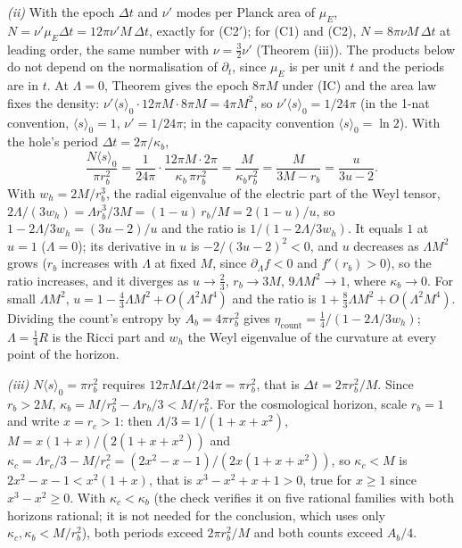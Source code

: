 \emph{(ii)} With the epoch $\Delta t$ and $\nu'$ modes per Planck area of $\mu_{E}$, $N = \nu'\mu_{E}\Delta t = 12\pi\nu' M\,\Delta t$, exactly for (C2$'$); for (C1) and (C2), $N = 8\pi\nu M\,\Delta t$ at leading order, the same number with $\nu = \tfrac32\nu'$ (Theorem (iii)). The products below do not depend on the normalisation of $\partial_{t}$, since $\mu_{E}$ is per unit $t$ and the periods are in $t$. At $\Lambda = 0$, Theorem  gives the epoch $8\pi M$ under (IC) and the area law fixes the density: $\nu'\langle s\rangle_{0}\cdot 12\pi M\cdot 8\pi M = 4\pi M^{2}$, so $\nu'\langle s\rangle_{0} = 1/24\pi$ (in the 1-nat convention, $\langle s\rangle_{0} = 1$, $\nu' = 1/24\pi$; in the capacity convention $\langle s\rangle_{0} = \ln 2$). With the hole's period $\Delta t = 2\pi/\kappa_{b}$,
\[
\frac{N\langle s\rangle_{0}}{\pi r_{b}^{2}} = \frac{1}{24\pi}\cdot\frac{12\pi M\cdot 2\pi}{\kappa_{b}\,\pi r_{b}^{2}} = \frac{M}{\kappa_{b}r_{b}^{2}} = \frac{M}{3M - r_{b}} = \frac{u}{3u - 2} .
\]
With $w_{h} = 2M/r_{b}^{3}$, the radial eigenvalue of the electric part of the Weyl tensor, $2\Lambda/(3w_{h}) = \Lambda r_{b}^{3}/3M = (1 - u)\,r_{b}/M = 2(1 - u)/u$, so $1 - 2\Lambda/3w_{h} = (3u - 2)/u$ and the ratio is $1/(1 - 2\Lambda/3w_{h})$. It equals $1$ at $u = 1$ ($\Lambda = 0$); its derivative in $u$ is $-2/(3u - 2)^{2} < 0$, and $u$ decreases as $\Lambda M^{2}$ grows ($r_{b}$ increases with $\Lambda$ at fixed $M$, since $\partial_{\Lambda}f < 0$ and $f'(r_{b}) > 0$), so the ratio increases, and it diverges as $u \to \tfrac23$, $r_{b} \to 3M$, $9\Lambda M^{2} \to 1$, where $\kappa_{b} \to 0$. For small $\Lambda M^{2}$, $u = 1 - \tfrac43\Lambda M^{2} + O(\Lambda^{2}M^{4})$ and the ratio is $1 + \tfrac83\Lambda M^{2} + O(\Lambda^{2}M^{4})$. Dividing the count's entropy by $A_{b} = 4\pi r_{b}^{2}$ gives $\eta_{\mathrm{count}} = \tfrac14/(1 - 2\Lambda/3w_{h})$; $\Lambda = \tfrac14 R$ is the Ricci part and $w_{h}$ the Weyl eigenvalue of the curvature at every point of the horizon.

\emph{(iii)} $N\langle s\rangle_{0} = \pi r_{b}^{2}$ requires $12\pi M\Delta t/24\pi = \pi r_{b}^{2}$, that is $\Delta t = 2\pi r_{b}^{2}/M$. Since $r_{b} > 2M$, $\kappa_{b} = M/r_{b}^{2} - \Lambda r_{b}/3 < M/r_{b}^{2}$. For the cosmological horizon, scale $r_{b} = 1$ and write $x = r_{c} > 1$: then $\Lambda/3 = 1/(1 + x + x^{2})$, $M = x(1 + x)/(2(1 + x + x^{2}))$ and $\kappa_{c} = \Lambda r_{c}/3 - M/r_{c}^{2} = (2x^{2} - x - 1)/(2x(1 + x + x^{2}))$, so $\kappa_{c} < M$ is $2x^{2} - x - 1 < x^{2}(1 + x)$, that is $x^{3} - x^{2} + x + 1 > 0$, true for $x \ge 1$ since $x^{3} - x^{2} \ge 0$. With $\kappa_{c} < \kappa_{b}$ (the check verifies it on five rational families with both horizons rational; it is not needed for the conclusion, which uses only $\kappa_{c}, \kappa_{b} < M/r_{b}^{2}$), both periods exceed $2\pi r_{b}^{2}/M$ and both counts exceed $A_{b}/4$.


